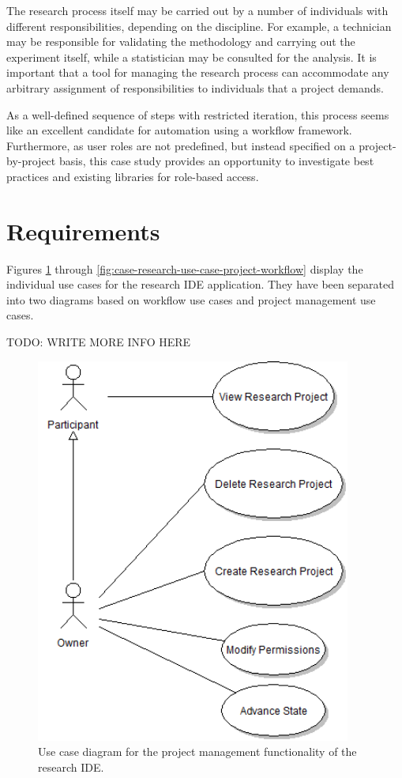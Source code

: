 The research process itself may be carried out by a number of individuals with different responsibilities, depending on the discipline. For example, a technician may be responsible for validating the methodology and carrying out the experiment itself, while a statistician may be consulted for the analysis. It is important that a tool for managing the research process can accommodate any arbitrary assignment of responsibilities to individuals that a project demands.

As a well-defined sequence of steps with restricted iteration, this process seems like an excellent candidate for automation using a workflow framework. Furthermore, as user roles are not predefined, but instead specified on a project-by-project basis, this case study provides an opportunity to investigate best practices and existing libraries for role-based access.



\section {Requirements}

Figures \ref{fig:case-research-use-case-project-management} through \ref{fig:case-research-use-case-project-workflow} display the individual use cases for the research IDE application. They have been separated into two diagrams based on workflow use cases and project management use cases.





TODO: WRITE MORE INFO HERE





\begin{figure}[!ht]
\centering \includegraphics[height=5in]{./img/case-study-research-railgun/project_management_use_case}
\caption{Use case diagram for the project management functionality of the research IDE.}
\label{fig:case-research-use-case-project-management}
\end{figure}


